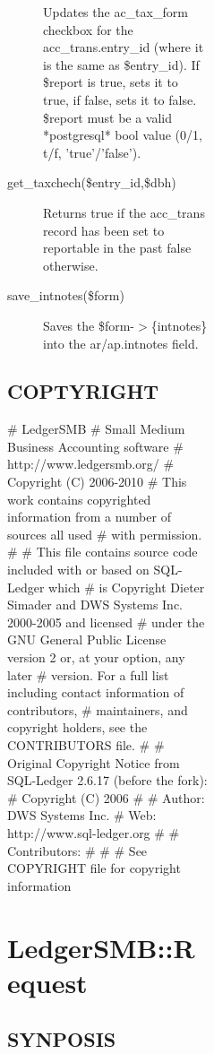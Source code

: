 \begin{description}
\begin{description}
\begin{description}
\begin{description}
\begin{description}
\begin{description}
\begin{description}
\begin{description}
Updates the ac\_tax\_form checkbox for the acc\_trans.entry\_id (where it is the 
same as \$entry\_id).  If \$report is true, sets it to true, if false, sets it to
false.  \$report must be a valid *postgresql* bool value (0/1, t/f, 
'true'/'false').


\item[{get\_taxchech(\$entry\_id,\$dbh)}] \mbox{}

Returns true if the acc\_trans record has been set to reportable in the past
false otherwise.


\item[{save\_intnotes(\$form)}] \mbox{}

Saves the \$form-$>$\{intnotes\} into the ar/ap.intnotes field.

\end{description}
\subsection*{COPTYRIGHT\label{LedgerSMB::AA_COPTYRIGHT}}


\# LedgerSMB
\# Small Medium Business Accounting software
\# http://www.ledgersmb.org/
\# Copyright (C) 2006-2010
\# This work contains copyrighted information from a number of sources all used
\# with permission.
\#
\# This file contains source code included with or based on SQL-Ledger which
\# is Copyright Dieter Simader and DWS Systems Inc. 2000-2005 and licensed
\# under the GNU General Public License version 2 or, at your option, any later
\# version.  For a full list including contact information of contributors,
\# maintainers, and copyright holders, see the CONTRIBUTORS file.
\#
\# Original Copyright Notice from SQL-Ledger 2.6.17 (before the fork):
\# Copyright (C) 2006
\#
\#  Author: DWS Systems Inc.
\#     Web: http://www.sql-ledger.org
\#
\#  Contributors:
\#
\#
\# See COPYRIGHT file for copyright information

\section{LedgerSMB::Request\label{LedgerSMB::Request}}




\subsection*{SYNPOSIS\label{LedgerSMB::Request_SYNPOSIS}}



\end{description}
\end{description}
\end{description}
\end{description}
\end{description}
\end{description}
\end{description}
